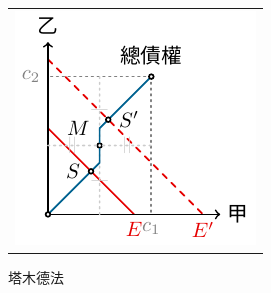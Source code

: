 \begin{center}
	\hfill
	\begin{tabular}{l}
		\includegraphics{divide/divide-talmud.pdf}
	\end{tabular}
	\hfill\textsf{塔木德法}
\end{center}
